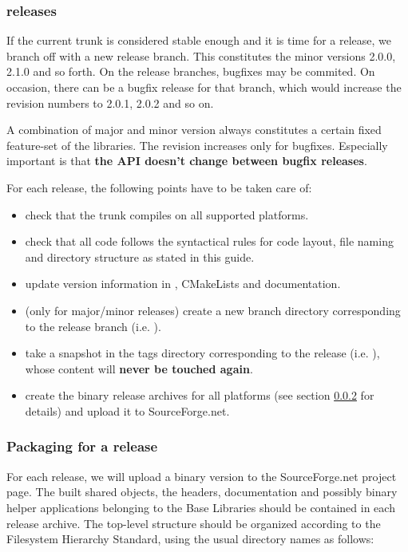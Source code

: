 \subsubsection{ releases}
\label{vista_releases}
If the current trunk is considered stable enough and it is time for a release, we branch off with a new release branch.
This constitutes the minor versions 2.0.0, 2.1.0 and so forth.
On the release branches, bugfixes may be commited. 
On occasion, there can be a bugfix release for that branch, which would increase the revision numbers to 2.0.1, 2.0.2 and so on.

A combination of major and minor version always constitutes a certain fixed feature-set of the  libraries. The revision increases only for bugfixes. Especially important is that \textbf{the API doesn't change between bugfix releases}.

For each release, the following points have to be taken care of:
\begin{itemize}
\item check that the trunk compiles on all supported platforms. %
\item check that all code follows the syntactical rules for code layout, file naming and directory structure as stated in this guide.
\item update version information in , CMakeLists and documentation.
\item (only for major/minor releases) create a new branch directory corresponding to the release branch (i.e. ).
\item take a snapshot in the tags directory corresponding to the release (i.e. ), whose content will \textbf{never be touched again}.
\item create the binary release archives for all platforms (see section \ref{packaging} for details) and upload it to SourceForge.net.
\end{itemize}


\subsubsection{Packaging  for a release}
\label{packaging}

For each  release, we will upload a binary version to the SourceForge.net project page.
The built shared objects, the headers, documentation and possibly binary helper applications belonging to the Base Libraries should be contained in each release archive. 
The top-level structure should be organized according to the Filesystem Hierarchy Standard, using the usual directory names as follows:

